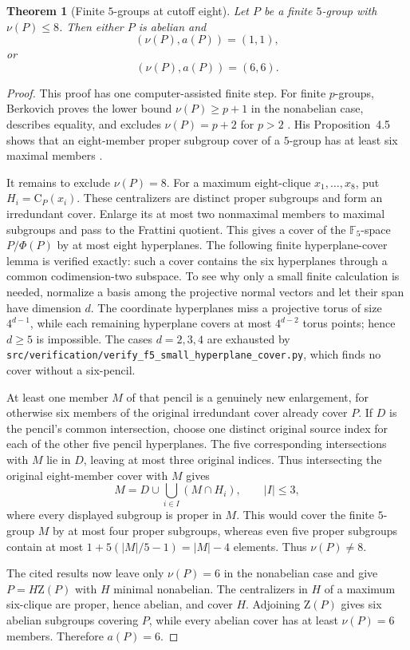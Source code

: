 \documentclass[11pt]{article}
\newtheorem{theorem}{Theorem}[section]
\theoremstyle{remark}
\newcommand{\nuG}{\nu}
\newcommand{\aG}{a}
\newcommand{\F}{\mathbb F}
\newcommand{\Z}{\mathrm Z}
\newcommand{\CG}{\mathrm C}
\begin{document}
\begin{theorem}[Finite $5$-groups at cutoff eight]
\label{thm:five-group-cutoff-eight}
Let $P$ be a finite $5$-group with $\nuG(P)\le8$. Then either $P$ is
abelian and
\[
  (\nuG(P),\aG(P))=(1,1),
\]
or
\[
  (\nuG(P),\aG(P))=(6,6).
\]
\end{theorem}

\begin{proof}
This proof has one computer-assisted finite step. For finite $p$-groups,
Berkovich proves the lower bound $\nuG(P)\ge p+1$ in the nonabelian case,
describes equality, and excludes $\nuG(P)=p+2$ for $p>2$
\cite[Lemma~1.2, p.~416; Theorem~2.3, pp.~419--420;
Theorem~4.4, pp.~424--425]{berkovich_2010_covers}. His Proposition~4.5
shows that an eight-member proper subgroup cover of a $5$-group has at
least six maximal members
\cite[Proposition~4.5, pp.~425--426]{berkovich_2010_covers}.

It remains to exclude $\nuG(P)=8$.  For a maximum eight-clique
$x_1,\ldots,x_8$, put $H_i=\CG_P(x_i)$.  These centralizers are distinct
proper subgroups and form an irredundant cover.
Enlarge its at most two nonmaximal members to maximal subgroups and pass to
the Frattini quotient. This gives a cover of the $\F_5$-space
$P/\Phi(P)$ by at most eight hyperplanes. The following finite
hyperplane-cover lemma is verified exactly: such a cover contains the six
hyperplanes through a common codimension-two subspace. To see why only a
small finite calculation is needed, normalize a basis among the projective
normal vectors and let their span have dimension $d$. The coordinate
hyperplanes miss a projective torus of size $4^{d-1}$, while each remaining
hyperplane covers at most $4^{d-2}$ torus points; hence $d\ge5$ is
impossible. The cases $d=2,3,4$ are exhausted by
\texttt{src/verification/verify\_f5\_small\_hyperplane\_cover.py}, which
finds no cover without a six-pencil.

At least one member $M$ of that pencil is a genuinely new enlargement, for
otherwise six members of the original irredundant cover already cover $P$.
If $D$ is the pencil's common intersection, choose one distinct original
source index for each of the other five pencil hyperplanes.  The five
corresponding intersections with $M$ lie in $D$, leaving at most three
original indices.  Thus intersecting the original eight-member cover with
$M$ gives
\[
  M=D\cup\bigcup_{i\in I}(M\cap H_i),\qquad |I|\le3,
\]
where every displayed subgroup is proper in $M$. This would cover the
finite $5$-group $M$ by at most four proper subgroups, whereas even five
proper subgroups contain at most
$1+5(|M|/5-1)=|M|-4$ elements. Thus $\nuG(P)\ne8$.

The cited results now leave only $\nuG(P)=6$ in the nonabelian case and give
$P=H\Z(P)$ with $H$ minimal nonabelian. The centralizers in $H$ of a
maximum six-clique are proper, hence abelian, and cover $H$. Adjoining
$\Z(P)$ gives six abelian subgroups covering $P$, while every abelian cover
has at least $\nuG(P)=6$ members. Therefore $\aG(P)=6$.
\end{proof}
\end{document}
